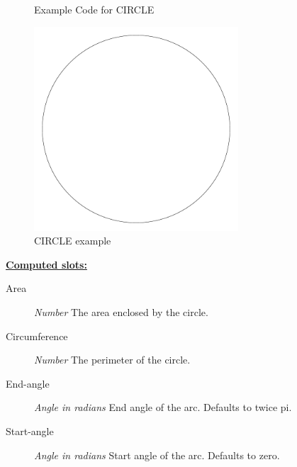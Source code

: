 \documentclass [11pt]{book}
\begin{document}
\begin{itemize}
\begin{figure}
\caption{Example Code for CIRCLE}

\label{fig:example-code-CIRCLE}

\end{figure}

\begin{figure}
\begin{center}
\includegraphics[width=3in,height=3in]{../images/example-CIRCLE.pdf}
\end{center}

\caption{CIRCLE example}

\label{fig:CIRCLE}

\end{figure}





\textbf{
\underline{Computed slots:}}

\begin{description}

\item [Area]
\emph{Number} The area enclosed by the circle.


\item [Circumference]
\emph{Number} The perimeter of the circle.


\item [End-angle]
\emph{Angle in radians} End angle of the arc. Defaults to twice pi.


\item [Start-angle]
\emph{Angle in radians} Start angle of the arc. Defaults to zero.


\end{description}








\end{itemize}
\end{document}
